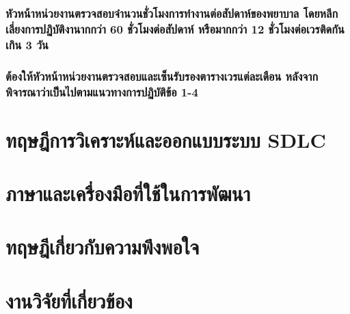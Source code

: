 \hspace{0.5cm}\hangindent=2.6cm\subsubsection{หัวหน้าหน่วยงานตรวจสอบจำนวนชั่วโมงการทำงานต่อสัปดาห์ของพยาบาล โดยหลีกเลี่ยงการปฏิบัติงานากกว่า 60 ชั่วโมงต่อสัปดาห์ หรือมากกว่า 12 ชั่วโมงต่อเวรติดกันเกิน 3 วัน}

\hspace{0.5cm}\hangindent=2.6cm\subsubsection{ต้องให้หัวหน้าหน่วยงานตรวจสอบและเซ็นรับรองตารางเวรแต่ละเดือน หลังจากพิจารณาว่าเป็นไปตามแนวทางการปฏิบัติข้อ 1-4}



\section{ทฤษฎีการวิเคราะห์และออกแบบระบบ SDLC}

\section{ภาษาและเครื่องมือที่ใช้ในการพัฒนา}

\section{ทฤษฎีเกี่ยวกับความพึงพอใจ}

\section{งานวิจัยที่เกี่ยวข้อง}

